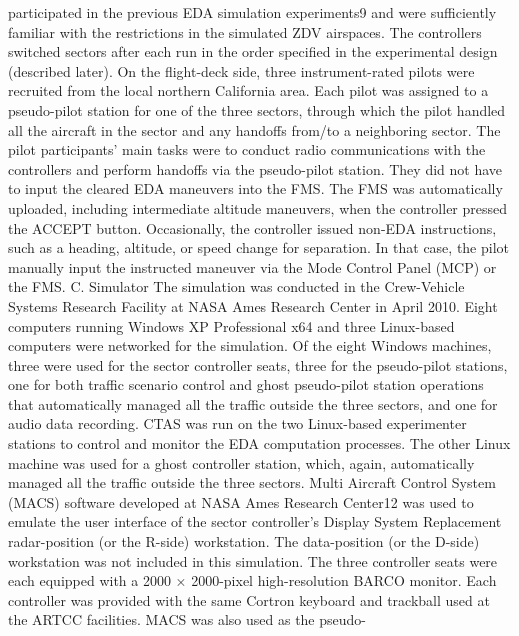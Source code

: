 \documentclass{aer1315-pretty}
\begin{document}
\begin{itemize}
participated in the previous EDA simulation experiments9 and were sufficiently familiar with the restrictions in the
simulated ZDV airspaces. The controllers switched sectors after each run in the order specified in the experimental
design (described later).
    On the flight-deck side, three instrument-rated pilots were recruited from the local northern California area. Each
pilot was assigned to a pseudo-pilot station for one of the three sectors, through which the pilot handled all the
aircraft in the sector and any handoffs from/to a neighboring sector. The pilot participants’ main tasks were to
conduct radio communications with the controllers and perform handoffs via the pseudo-pilot station. They did not
have to input the cleared EDA maneuvers into the FMS. The FMS was automatically uploaded, including
intermediate altitude maneuvers, when the controller pressed the ACCEPT button. Occasionally, the controller
issued non-EDA instructions, such as a heading, altitude, or speed change for separation. In that case, the pilot
manually input the instructed maneuver via the Mode Control Panel (MCP) or the FMS.
C. Simulator
    The simulation was conducted in the Crew-Vehicle Systems Research Facility at NASA Ames Research Center
in April 2010. Eight computers running Windows XP Professional x64 and three Linux-based computers were
networked for the simulation. Of the eight Windows machines, three were used for the sector controller seats, three
for the pseudo-pilot stations, one for both traffic scenario control and ghost pseudo-pilot station operations that
automatically managed all the traffic outside the three sectors, and one for audio data recording. CTAS was run on
the two Linux-based experimenter stations to control and monitor the EDA computation processes. The other Linux
machine was used for a ghost controller station, which, again, automatically managed all the traffic outside the three
sectors. Multi Aircraft Control System (MACS) software developed at NASA Ames Research Center12 was used to
emulate the user interface of the sector controller’s Display System Replacement radar-position (or the R-side)
workstation. The data-position (or the D-side) workstation was not included in this simulation. The three controller
seats were each equipped with a 2000 × 2000-pixel high-resolution BARCO monitor. Each controller was provided
with the same Cortron keyboard and trackball used at the ARTCC facilities. MACS was also used as the pseudo-



\end{itemize}
\end{document}
